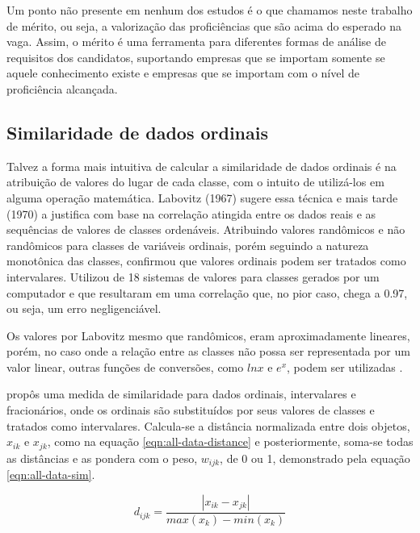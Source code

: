 \documentclass[preprint,12pt]{elsarticle}
\begin{document}
Um ponto não presente em nenhum dos estudos é o que chamamos neste trabalho de mérito, ou seja, a valorização das proficiências que são acima do esperado na vaga. Assim, o mérito é uma ferramenta para diferentes formas de análise de requisitos dos candidatos, suportando empresas que se importam somente se aquele conhecimento existe e empresas que se importam com o nível de proficiência alcançada.

\subsection{Similaridade de dados ordinais}
\label{ssec:sim-ordinal-data}

Talvez a forma mais intuitiva de calcular a similaridade de dados ordinais é na atribuição de valores do lugar de cada classe, com o intuito de utilizá-los em alguma operação matemática. Labovitz (1967) \cite{labovitz-1967-observation-statistics} sugere essa técnica e mais tarde (1970) \cite{assignment-rank-order-1970} a justifica com base na correlação atingida entre os dados reais e as sequências de valores de classes ordenáveis. Atribuindo valores randômicos e não randômicos para classes de variáveis ordinais, porém seguindo a natureza monotônica das classes, confirmou que valores ordinais podem ser tratados como intervalares. Utilizou de 18 sistemas de valores para classes gerados por um computador e que resultaram em uma correlação que, no pior caso, chega a 0.97, ou seja, um erro negligenciável. 

Os valores por Labovitz \cite{assignment-rank-order-1970} mesmo que randômicos, eram aproximadamente lineares, porém, no caso onde a relação entre as classes não possa ser representada por um valor linear, outras funções de conversões, como $ln x$ e $e^x$, podem ser utilizadas \cite{assignment-rank-order-1970}.

\cite{analysis-cluster} propôs uma medida de similaridade para dados ordinais, intervalares e fracionários, onde os ordinais são substituídos por seus valores de classes e tratados como intervalares. Calcula-se a distância normalizada entre dois objetos, $x_{ik}$ e $x_{jk}$, como na equação \ref{eqn:all-data-distance} e posteriormente, soma-se todas as distâncias e as pondera com o peso, $w_{ijk}$, de 0 ou 1, demonstrado pela equação \ref{eqn:all-data-sim}.

\begin{equation}
\label{eqn:all-data-distance}
    d_{ijk} =  \frac{|x_{ik} - x_{jk}|}{max(x_k) - min(x_k)}
\end{equation}
\end{document}
